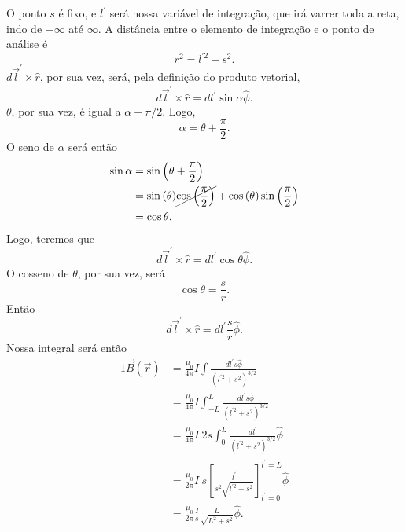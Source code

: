 \documentclass{article}
\newcommand{\rcaligrafico}{r}
\begin{document}
O ponto $s$ é fixo, e $l^{\prime}$ será nossa variável de integração, que irá varrer toda a reta, indo de $-\infty$ até $\infty$. A distância entre o elemento de
integração e o ponto de análise é
\begin{equation}
 \rcaligrafico^2 = l^{\prime 2} + s^2.
\end{equation}
$d\vec{l}^{\prime} \times \hat{\rcaligrafico}$, por sua vez, será, pela definição do produto vetorial,
\begin{equation}
 d\vec{l}^{\prime} \times \hat{\rcaligrafico} = dl^{\prime} \sin{\alpha} \hat{\phi}.
\end{equation}
$\theta$, por sua vez, é igual a $\alpha - \pi\slash 2$. Logo,
\begin{equation}
 \alpha = \theta + \frac{\pi}{2}.
\end{equation}
O seno de $\alpha$ será então
\begin{alignat}{1}
\nonumber
 \sin{\alpha} &= \sin{\left( \theta + \frac{\pi}{2}\right) }\\ \nonumber
 &= \sin{\left( \theta \right) } \cancel{\cos{\left(\frac{\pi}{2}\right)}} + \cos{\left( \theta \right) } \sin{\left(\frac{\pi}{2}\right)}\\
 &= \cos{\theta}.
\end{alignat}
Logo, teremos que
\begin{equation}
 d\vec{l}^{\prime} \times \hat{\rcaligrafico} = dl^{\prime} \cos{\theta} \hat{\phi}.
\end{equation}
O cosseno de $\theta$, por sua vez, será
\begin{equation}
 \cos{\theta} = \frac{s}{\rcaligrafico}.
\end{equation}
Então
\begin{equation}
 d\vec{l}^{\prime} \times \hat{\rcaligrafico} = dl^{\prime} \frac{s}{\rcaligrafico} \hat{\phi}.
\end{equation}
Nossa integral será então
\begin{alignat}{1}
 \vec{B}(\vec{r}) &= \frac{\mu_0}{4\pi} I \int \frac{dl^{\prime} s \hat{\phi}}{(l^{\prime 2} + s^2)^{3\slash 2}} \\
 &= \frac{\mu_0}{4\pi} I \int_{-L}^{L} \frac{dl^{\prime} s \hat{\phi}}{(l^{\prime 2} + s^2)^{3\slash 2}} \\ 
 &= \frac{\mu_0}{4\pi} I\ 2s\int_{0}^{L} \frac{dl^{\prime}}{(l^{\prime 2} + s^2)^{3 \slash 2}} \hat{\phi} \\
 &= \frac{\mu_0}{2\pi} I\ s \left[ \frac{l^{\prime}}{s^2\sqrt{l^{\prime 2} + s^2}}\right]_{l^{\prime} = 0}^{l^{\prime} = L} \hat{\phi}\\
 &= \frac{\mu_0}{2\pi} \frac{I}{s}\frac{L}{\sqrt{L^2 + s^2}} \hat{\phi}.
\end{alignat}
\end{document}
